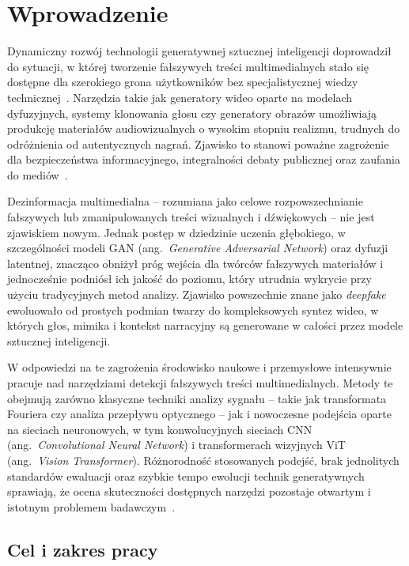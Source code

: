 \chapter{Wprowadzenie}

Dynamiczny rozwój technologii generatywnej sztucznej inteligencji doprowadził do sytuacji, w której tworzenie fałszywych treści multimedialnych stało się dostępne dla szerokiego grona użytkowników bez specjalistycznej wiedzy technicznej~\cite{Khan2025ComprehensiveSurvey,Li2025AIGCSurvey}.
Narzędzia takie jak generatory wideo oparte na modelach dyfuzyjnych, systemy klonowania głosu czy generatory obrazów umożliwiają produkcję materiałów audiowizualnych o wysokim stopniu realizmu, trudnych do odróżnienia od autentycznych nagrań.
Zjawisko to stanowi poważne zagrożenie dla bezpieczeństwa informacyjnego, integralności debaty publicznej oraz zaufania do mediów~\cite{Europol2023Deepfakes}.

Dezinformacja multimedialna -- rozumiana jako celowe rozpowszechnianie fałszywych lub zmanipulowanych treści wizualnych i dźwiękowych -- nie jest zjawiskiem nowym.
Jednak postęp w dziedzinie uczenia głębokiego, w szczególności modeli GAN (ang.~\textit{Generative Adversarial Network}) oraz dyfuzji latentnej, znacząco obniżył próg wejścia dla twórców fałszywych materiałów i jednocześnie podniósł ich jakość do poziomu, który utrudnia wykrycie przy użyciu tradycyjnych metod analizy.
Zjawisko powszechnie znane jako \textit{deepfake} ewoluowało od prostych podmian twarzy do kompleksowych syntez wideo, w których głos, mimika i kontekst narracyjny są generowane w całości przez modele sztucznej inteligencji.

W odpowiedzi na te zagrożenia środowisko naukowe i przemysłowe intensywnie pracuje nad narzędziami detekcji fałszywych treści multimedialnych.
Metody te obejmują zarówno klasyczne techniki analizy sygnału -- takie jak transformata Fouriera czy analiza przepływu optycznego -- jak i nowoczesne podejścia oparte na sieciach neuronowych, w tym konwolucyjnych sieciach CNN (ang.~\textit{Convolutional Neural Network}) i transformerach wizyjnych ViT (ang.~\textit{Vision Transformer}).
Różnorodność stosowanych podejść, brak jednolitych standardów ewaluacji oraz szybkie tempo ewolucji technik generatywnych sprawiają, że ocena skuteczności dostępnych narzędzi pozostaje otwartym i istotnym problemem badawczym~\cite{Wang2024ReliabilityPerspective}.

\section*{Cel i zakres pracy}

